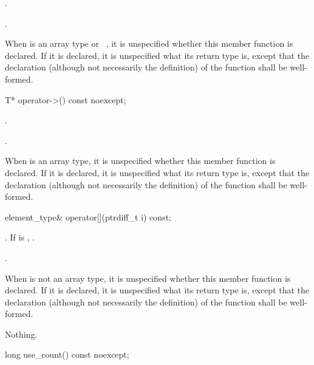 \begin{itemdescr}
\pnum
\requires  {}.

\pnum
\returns
{}.

\pnum
\remarks
When  is an array type or \cv{}~,
it is unspecified whether this
member function is declared. If it is declared, it is unspecified what its
return type is, except that the declaration (although not necessarily the
definition) of the function shall be well-formed.
\end{itemdescr}

%
\begin{itemdecl}
T* operator->() const noexcept;
\end{itemdecl}

\begin{itemdescr}
\pnum
\requires  {}.

\pnum
\returns
{}.

\pnum
\remarks
When  is an array type,
it is unspecified whether this member function is declared.
If it is declared, it is unspecified what its return type is,
except that the declaration (although not necessarily the definition)
of the function shall be well-formed.
\end{itemdescr}

%
\begin{itemdecl}
element_type& operator[](ptrdiff_t i) const;
\end{itemdecl}

\begin{itemdescr}
\pnum
\requires {}.
If  is , .

\pnum
\returns
{}.

\pnum
\remarks
When  is not an array type,
it is unspecified whether this member function is declared.
If it is declared, it is unspecified what its return type is,
except that the declaration (although not necessarily the definition)
of the function shall be well-formed.

\pnum
\throws
Nothing.
\end{itemdescr}

%
\begin{itemdecl}
long use_count() const noexcept;
\end{itemdecl}

